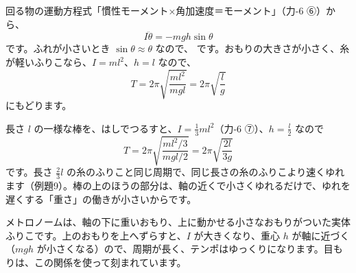 \par\vspace{4pt}
回る物の運動方程式「慣性モーメント×角加速度＝モーメント」（力-6 ⑥）から、
\[I\ddot\theta=-mgh\sin\theta\]
です。ふれが小さいとき $\sin\theta\approx\theta$ なので、
です。おもりの大きさが小さく、糸が軽いふりこなら、$I=ml^2$、$h=l$ なので、
\[T=2\pi\sqrt{\frac{ml^2}{mgl}}=2\pi\sqrt{\frac{l}{g}}\]
にもどります。

\begin{phflow}[実体ふりこ]
\end{phflow}

長さ $l$ の一様な棒を、はしでつるすと、$I=\tfrac{1}{3}ml^2$（力-6 ⑦）、$h=\tfrac{l}{2}$ なので
\[T=2\pi\sqrt{\frac{ml^2/3}{mgl/2}}=2\pi\sqrt{\frac{2l}{3g}}\]
です。長さ $\tfrac{2}{3}l$ の糸のふりこと同じ周期で、同じ長さの糸のふりこより速くゆれます（例題9）。棒の上のほうの部分は、軸の近くで小さくゆれるだけで、ゆれを遅くする「重さ」の働きが小さいからです。

\begin{phmijika}[メトロノーム]
メトロノームは、軸の下に重いおもり、上に動かせる小さなおもりがついた実体ふりこです。上のおもりを上へずらすと、$I$ が大きくなり、重心 $h$ が軸に近づく（$mgh$ が小さくなる）ので、周期が長く、テンポはゆっくりになります。目もりは、この関係を使って刻まれています。
\end{phmijika}

